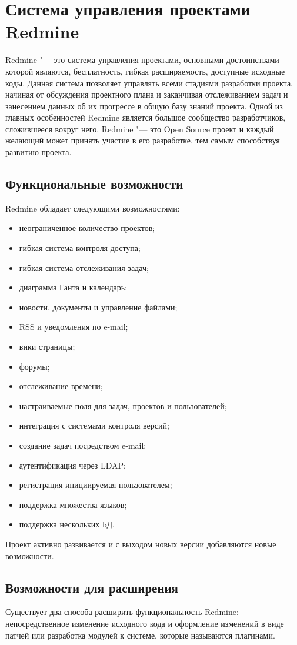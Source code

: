 \section{Система управления проектами Redmine}
Redmine "--- это система управления проектами, основными достоинствами которой
являются, бесплатность, гибкая расширяемость, доступные исходные коды.
Данная система позволяет управлять всеми стадиями разработки проекта, начиная
от обсуждения проектного плана и заканчивая отслеживанием задач и занесением
данных об их прогрессе в общую базу знаний проекта. Одной из главных
особенностей Redmine является большое сообщество разработчиков, сложившееся
вокруг него. Redmine "--- это Open Source проект и каждый желающий может принять
участие в его разработке, тем самым способствуя развитию проекта.

\subsection{Функциональные возможности}
Redmine обладает следующими возможностями:
\begin{itemize}
  \item неограниченное количество проектов;
  \item гибкая система контроля доступа;
  \item гибкая система отслеживания задач;
  \item диаграмма Ганта и календарь;
  \item новости, документы и управление файлами;
  \item RSS и уведомления по e-mail;
  \item вики страницы;
  \item форумы;
  \item отслеживание времени;
  \item настраиваемые поля для задач, проектов и пользователей;
  \item интеграция с системами контроля версий;
  \item создание задач посредством e-mail;
  \item аутентификация через LDAP;
  \item регистрация инициируемая пользователем;
  \item поддержка множества языков;
  \item поддержка нескольких БД.
\end{itemize}
Проект активно развивается и с выходом новых версии добавляются новые
возможности.

\subsection{Возможности для расширения}
Существует два способа расширить функциональность Redmine: непосредственное
изменение исходного кода и оформление изменений в виде патчей или разработка 
модулей к системе, которые называются плагинами.

